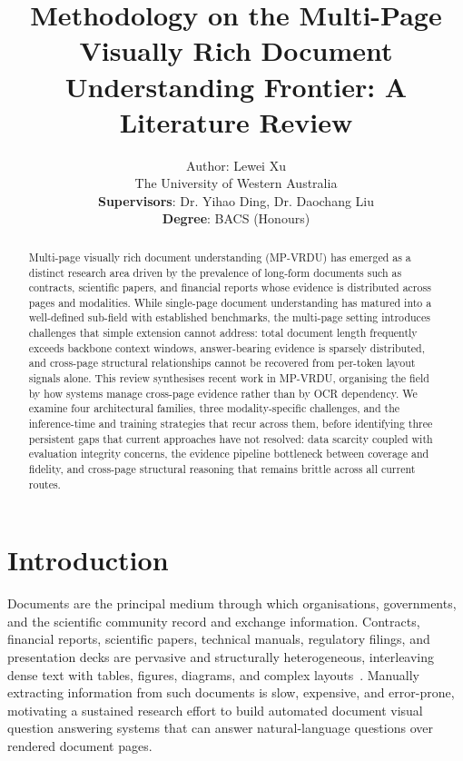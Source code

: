 \documentclass[11pt]{article}
\title{Methodology on the Multi-Page Visually Rich Document Understanding Frontier: A Literature Review}
\author{Author: Lewei Xu \\
  The University of Western Australia \\
  \textbf{Supervisors}: Dr. Yihao Ding, Dr. Daochang Liu \\
  \textbf{Degree}: BACS (Honours) \\}
\begin{document}
\maketitle
\begin{abstract}
Multi-page visually rich document understanding (MP-VRDU) has emerged as a distinct research area driven by the prevalence of long-form documents such as contracts, scientific papers, and financial reports whose evidence is distributed across pages and modalities. While single-page document understanding has matured into a well-defined sub-field with established benchmarks, the multi-page setting introduces challenges that simple extension cannot address: total document length frequently exceeds backbone context windows, answer-bearing evidence is sparsely distributed, and cross-page structural relationships cannot be recovered from per-token layout signals alone. This review synthesises recent work in MP-VRDU, organising the field by how systems manage cross-page evidence rather than by OCR dependency. We examine four architectural families, three modality-specific challenges, and the inference-time and training strategies that recur across them, before identifying three persistent gaps that current approaches have not resolved: data scarcity coupled with evaluation integrity concerns, the evidence pipeline bottleneck between coverage and fidelity, and cross-page structural reasoning that remains brittle across all current routes.
\end{abstract}

\section{Introduction}
\label{sec:introduction}
Documents are the principal medium through which organisations, governments, and the scientific community record and exchange information. Contracts, financial reports, scientific papers, technical manuals, regulatory filings, and presentation decks are pervasive and structurally heterogeneous, interleaving dense text with tables, figures, diagrams, and complex layouts~\cite{tito2023hierarchical,borchmann2025arctic}. Manually extracting information from such documents is slow, expensive, and error-prone, motivating a sustained research effort to build automated document visual question answering systems that can answer natural-language questions over rendered document pages.
\end{document}
